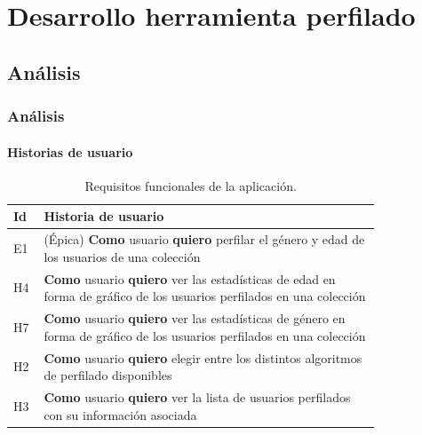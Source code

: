 \documentclass{beamer}
\begin{document}
\section{Desarrollo herramienta perfilado}
\subsection{Análisis}
	\begin{frame}
		\frametitle{Análisis}
		\framesubtitle{Historias de usuario}
		\begin{table}[H]
			{
				\setlength\arrayrulewidth{0.75pt}
				\setlength{\tabcolsep}{0.9\tabcolsep}
				
				\begin{tabular}{|p{0.04\linewidth} | p{0.78\linewidth}|}
					\hline
					Id & Historia de usuario \\ \hline 

					E1 & (Épica) \textbf{Como} usuario \textbf{quiero} perfilar el género y edad de los usuarios de una colección \\  \hline
					
					H4 & \textbf{Como} usuario \textbf{quiero} ver las estadísticas de edad en forma de gráfico de los usuarios perfilados en una colección \\ \hline
					H7 & \textbf{Como} usuario \textbf{quiero} ver las estadísticas de género en forma de gráfico de los usuarios perfilados en una colección \\ \hline
					H2 & \textbf{Como} usuario \textbf{quiero} elegir entre los distintos algoritmos de perfilado disponibles \\ \hline
					H3 & \textbf{Como} usuario \textbf{quiero} ver la lista de usuarios perfilados con su información asociada \\ \hline
					
				\end{tabular}
			}
			\caption{Requisitos funcionales de la aplicación.}
			\label{tab:user-stories}
		\end{table}
	\end{frame}
	
\end{document}
